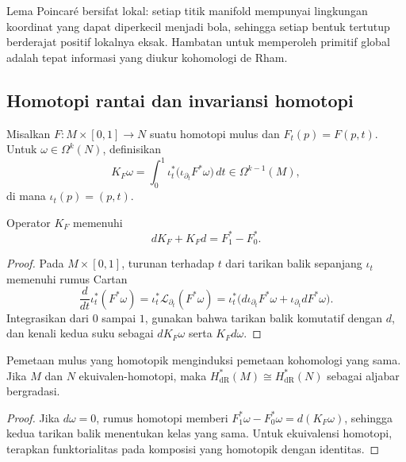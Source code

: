 \begin{bemerkung}\label{o011-br-rem-local-global}
Lema Poincar\'e bersifat lokal: setiap titik manifold mempunyai lingkungan
koordinat yang dapat diperkecil menjadi bola, sehingga setiap bentuk tertutup
berderajat positif lokalnya eksak. Hambatan untuk memperoleh primitif global
adalah tepat informasi yang diukur kohomologi de Rham.
\end{bemerkung}

\subsection{Homotopi rantai dan invariansi homotopi}

Misalkan $F\colon M\times[0,1]\to N$ suatu homotopi mulus dan
$F_t(p)=F(p,t)$. Untuk $\omega\in\Omega^k(N)$, definisikan
\[
 K_F\omega
 =\int_0^1 \iota_t^*\bigl(\iota_{\partial_t}F^*\omega\bigr)\,dt
 \in\Omega^{k-1}(M),
\]
di mana $\iota_t(p)=(p,t)$.

\begin{Theorem}\label{o011-br-thm-chain-homotopy}
Operator $K_F$ memenuhi
\[
 dK_F+K_Fd=F_1^*-F_0^*.
\]
\end{Theorem}

\begin{proof}
Pada $M\times[0,1]$, turunan terhadap $t$ dari tarikan balik sepanjang
$\iota_t$ memenuhi rumus Cartan
\[
 \frac d{dt}\iota_t^*(F^*\omega)
 =\iota_t^*\mathcal L_{\partial_t}(F^*\omega)
 =\iota_t^*\bigl(d\iota_{\partial_t}F^*\omega
 +\iota_{\partial_t}dF^*\omega\bigr).
\]
Integrasikan dari $0$ sampai $1$, gunakan bahwa tarikan balik komutatif dengan
$d$, dan kenali kedua suku sebagai $dK_F\omega$ serta $K_Fd\omega$.
\end{proof}

\begin{Korollar}\label{o011-br-cor-homotopy-invariance}
Pemetaan mulus yang homotopik menginduksi pemetaan kohomologi yang sama. Jika
$M$ dan $N$ ekuivalen-homotopi, maka
$H^*_{\mathrm{dR}}(M)\cong H^*_{\mathrm{dR}}(N)$ sebagai aljabar bergradasi.
\end{Korollar}

\begin{proof}
Jika $d\omega=0$, rumus homotopi memberi
$F_1^*\omega-F_0^*\omega=d(K_F\omega)$, sehingga kedua tarikan balik menentukan
kelas yang sama. Untuk ekuivalensi homotopi, terapkan funktorialitas pada
komposisi yang homotopik dengan identitas.
\end{proof}

